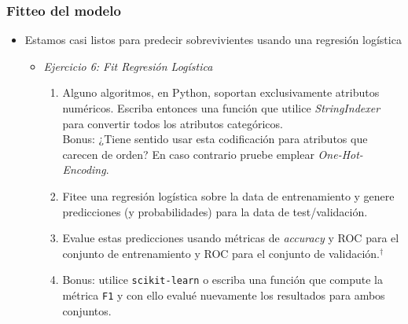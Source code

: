 \documentclass[leqno, 10pt, envcountsect]{beamer}
\numberwithin{equation}{section}
\theoremstyle{definition}
\theoremstyle{example}
\numberwithin{figure}{section}
\numberwithin{table}{section}
\let\olditem\item
\renewcommand{\item}{%
\olditem\vspace{1pt}}
\begin{document}
\begin{frame}[fragile=singleslide]
  \frametitle{Fitteo del modelo}
  \begin{itemize}
    \item Estamos casi listos para predecir sobrevivientes usando una regresión
      logística
      \begin{itemize}
        \item \textit{Ejercicio 6: Fit Regresión Logística}
          \begin{enumerate}
            \item Alguno algoritmos, en Python, soportan exclusivamente
              atributos numéricos.
              Escriba entonces una función que utilice \textit{StringIndexer} para
              convertir todos los atributos categóricos.\\
              Bonus: ¿Tiene sentido usar esta codificación para
                atributos que carecen de orden? En caso contrario pruebe
                emplear \textit{One-Hot-Encoding}.
            \item Fitee una regresión logística sobre la data de entrenamiento y
              genere predicciones (y probabilidades) para la data de test/validación.
            \item Evalue estas predicciones usando métricas
              de \textit{accuracy} y ROC para el conjunto de entrenamiento y ROC
              para el conjunto de validación.$^{\dag}$
            \item Bonus: utilice \texttt{scikit-learn} o escriba una función
              que compute la métrica \texttt{F1} y con ello evalué nuevamente
              los resultados para ambos conjuntos.
          \end{enumerate}
      \end{itemize}
  \end{itemize}
\end{frame}
\end{document}
